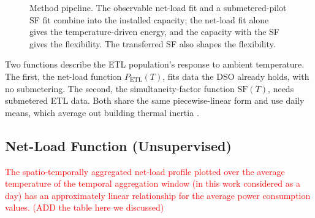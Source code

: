 \documentclass[9pt,journal,a4]{IEEEtran}
\begin{document}
\begin{figure}[t]
\centering
{}
\caption{Method pipeline. The observable net-load fit and a submetered-pilot SF fit combine into the installed capacity; the net-load fit alone gives the temperature-driven energy, and the capacity with the SF gives the flexibility. The transferred SF also shapes the flexibility.}
\label{fig:pipeline}
\end{figure}

Two functions describe the ETL population's response to ambient temperature. The first, the net-load function $P_{\mathrm{ETL}}(T)$, fits data the DSO already holds, with no submetering. The second, the simultaneity-factor function $\mathrm{SF}(T)$, needs submetered ETL data. Both share the same piecewise-linear form and use daily means, which average out building thermal inertia \cite{Per17b}.

\subsection{Net-Load Function (Unsupervised)}
\label{sec:fits-net}

\textcolor{red}{
The spatio-temporally aggregated net-load profile plotted over the average temperature of the temporal aggregation window (in this work considered as a day) has an approximately linear relationship for the average power consumption values. 
(ADD the table here we discussed)
}
\end{document}
